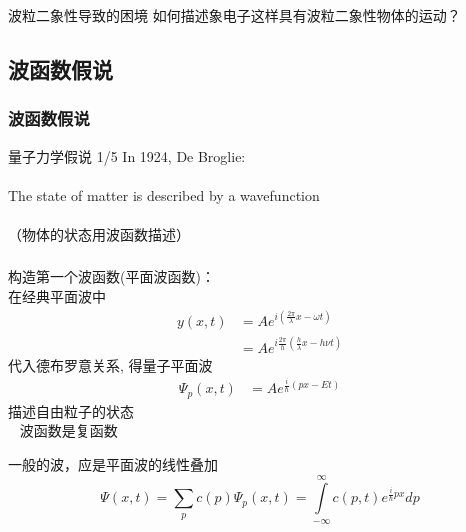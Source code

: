 \begin{frame}
    \centering
    \begin{atcbox}{波粒二象性导致的困境}
        {如何描述象电子这样具有波粒二象性物体的运动？}
    \end{atcbox}
\end{frame}

\subsection{波函数假说}

\begin{frame}
    \frametitle{波函数假说}
    \begin{atcbox}{量子力学假说 1/5}
    In 1924, De Broglie:\\
    ~\\
    The state of matter is described by a wavefunction \\
    ~\\
    （物体的状态用波函数描述）
    \end{atcbox}
\end{frame}

\begin{frame}
    \frametitle{}
    构造第一个波函数(平面波函数)：~\\
    在经典平面波中
        \begin{equation*}
            \begin{split}
                y(x,t)&=A e^{i(\frac{2\pi}{\lambda}x-\omega t)} \\
                    & = A e^{i\frac{2\pi}{h}(\frac{h}{\lambda}x-h\nu t)}
            \end{split} 
        \end{equation*}
        代入德布罗意关系, 得量子平面波
        \begin{equation*}
            \begin{split}
                \Psi_p(x,t)&=A e^{\frac{i}{\hbar}(px-Et)}
            \end{split} 
         \end{equation*}
         描述自由粒子的状态\\
         \Note ~ 波函数是复函数 
\end{frame}

\begin{frame}
         一般的波，应是平面波的线性叠加
         \begin{equation*}
                \Psi(x,t)=\sum\limits_{p} c(p)\Psi_p(x,t) = \int\limits_{-\infty} ^{\infty} c(p,t) e^{\frac{i}{\hbar}px}dp
         \end{equation*}
\end{frame}


